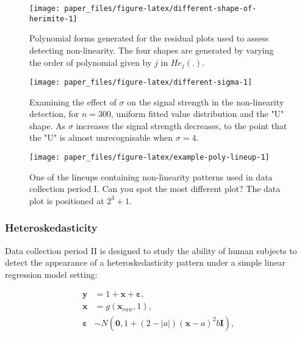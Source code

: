 \documentclass[]{interact}
\theoremstyle{plain}%
\theoremstyle{definition}
\theoremstyle{remark}
\begin{document}
\begin{figure}

{\centering \texttt{[image: paper\_files/figure-latex/different-shape-of-herimite-1]} 

}

\caption{Polynomial forms generated for the residual plots used to assess detecting non-linearity. The four shapes are generated by varying the order of polynomial given by $j$ in $He_j(.)$.}\label{fig:different-shape-of-herimite}
\end{figure}

\begin{figure}

{\centering \texttt{[image: paper\_files/figure-latex/different-sigma-1]} 

}

\caption{Examining the effect of $\sigma$ on the signal strength in the non-linearity detection, for $n=300$, uniform fitted value distribution and the "U" shape. As $\sigma$ increases the signal strength decreases, to the point that the "U" is almost unrecognisable when $\sigma=4$.}\label{fig:different-sigma}
\end{figure}

\begin{figure}[t!]

{\centering \texttt{[image: paper\_files/figure-latex/example-poly-lineup-1]} 

}

\caption{One of the lineups containing non-linearity patterns used in data collection period I. Can you spot the most different plot? The data plot is positioned at $2^3 + 1$.}\label{fig:example-poly-lineup}
\end{figure}

\hypertarget{heteroskedasticity}{%
\subsubsection{Heteroskedasticity}\label{heteroskedasticity}}

Data collection period II is designed to study the ability of human
subjects to detect the appearance of a heteroskedasticity pattern under
a simple linear regression model setting:

\begin{align} \label{eq:heter-model}
\boldsymbol{y} &= 1 + \boldsymbol{x} + \boldsymbol{\varepsilon},\\
\boldsymbol{x} &= g(\boldsymbol{x}_{raw}, 1),\\
\boldsymbol{\varepsilon} &\sim N(\boldsymbol{0}, 1 + (2 - |a|)(\boldsymbol{x} - a)^2b \boldsymbol{I}), 
\end{align}
\end{document}
